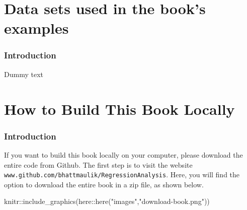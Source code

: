 \documentclass[
  letterpaper,
  paper =a4,
  twoside,
  openright,
  headsepline,
  footsepline,
  listof = totocnumbered,
  chapterprefix = true,
  firstiscover]{scrbook}
\newenvironment{Shaded}{\begin{snugshade}}{\end{snugshade}}
\newcommand{\FunctionTok}[1]{\textcolor[rgb]{0.28,0.35,0.67}{#1}}
\newcommand{\NormalTok}[1]{\textcolor[rgb]{0.00,0.23,0.31}{#1}}
\newcommand{\SpecialCharTok}[1]{\textcolor[rgb]{0.37,0.37,0.37}{#1}}
\newcommand{\StringTok}[1]{\textcolor[rgb]{0.13,0.47,0.30}{#1}}
\begin{document}
\hypertarget{data-sets-used-in-the-books-examples}{%
\chapter{Data sets used in the book's
examples}\label{data-sets-used-in-the-books-examples}}

\setcounter{figure}{0}
\renewcommand{\thefigure}{B.\arabic{figure}} 
\setcounter{table}{0}
\renewcommand{\thetable}{B.\arabic{table}}

\hypertarget{introduction-2}{%
\subsection{Introduction}\label{introduction-2}}

Dummy text

\hypertarget{how-to-build-this-book-locally}{%
\chapter{How to Build This Book
Locally}\label{how-to-build-this-book-locally}}

\setcounter{figure}{0}
\renewcommand{\thefigure}{C.\arabic{figure}}
\setcounter{table}{0}
\renewcommand{\thetable}{C.\arabic{table}}

\hypertarget{introduction-3}{%
\subsection{Introduction}\label{introduction-3}}

If you want to build this book locally on your computer, please download
the entire code from Github. The first step is to visit the website
\texttt{www.github.com/bhattmaulik/RegressionAnalysis}. Here, you will
find the option to download the entire book in a zip file, as shown
below.

\begin{Shaded}
\begin{Highlighting}[numbers=left,,]
\NormalTok{knitr}\SpecialCharTok{::}\FunctionTok{include\_graphics}\NormalTok{(here}\SpecialCharTok{::}\FunctionTok{here}\NormalTok{(}\StringTok{"images"}\NormalTok{,}\StringTok{"download{-}book.png"}\NormalTok{))}
\end{Highlighting}
\end{Shaded}
\end{document}
